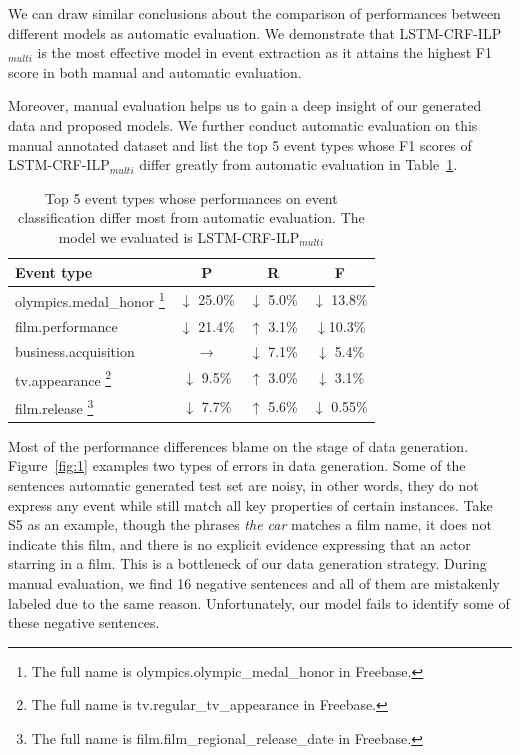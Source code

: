 \documentclass{article}
\begin{document}
We can draw similar conclusions about the comparison of performances between different models as automatic evaluation. We demonstrate that LSTM-CRF-ILP$_{multi}$ is the most effective model in event extraction as it attains the highest F1 score in both manual and automatic evaluation.

Moreover, manual evaluation helps us to gain a deep insight of our generated data and proposed models. We further conduct automatic evaluation on this manual annotated dataset and list the top 5 event types whose F1 scores of LSTM-CRF-ILP$_{multi}$ differ greatly from automatic evaluation in Table~\ref{tab:4}. 

\begin{table}[h]
\centering
\begin{tabular}{|l|c|c|c|} \hline
	Event type & P & R & F \\ \hline
	olympics.medal\_honor \footnote{The full name is olympics.olympic\_medal\_honor in Freebase.} & $\downarrow$ 25.0\% & $\downarrow$ 5.0\% & $\downarrow$ 13.8\% \\ \hline
	film.performance & $\downarrow$ 21.4\% & $\uparrow$ 3.1\% & $\downarrow$10.3\% \\ \hline
	business.acquisition & $\rightarrow$ & $\downarrow$ 7.1\% & $\downarrow$ 5.4\% \\ \hline
	tv.appearance \footnote{The full name is tv.regular\_tv\_appearance in Freebase.} & $\downarrow$ 9.5\% & $\uparrow$ 3.0\% & $\downarrow$ 3.1\% \\ \hline
	film.release \footnote{The full name is film.film\_regional\_release\_date in Freebase.} & $\downarrow$ 7.7\% & $\uparrow$ 5.6\% & $\downarrow$ 0.55\% \\ \hline
\end{tabular}
\caption{Top 5 event types whose performances on event classification differ most from automatic evaluation. The model we evaluated is LSTM-CRF-ILP$_{multi}$ \label{tab:4}}
\end{table}

Most of the performance differences blame on the stage of data generation. Figure~\ref{fig:1} examples two types of errors in data generation. Some of the sentences automatic generated test set are noisy, in other words, they do not express any event while still match all key properties of certain instances. Take S5 as an example, though the phrases \emph{the car} matches a film name, it does not indicate this film, and there is no explicit evidence expressing that an actor starring in a film. This is a bottleneck of our data generation strategy. During manual evaluation, we find 16 negative sentences and all of them are mistakenly labeled due to the same reason. Unfortunately, our model fails to identify some of these negative sentences.
\end{document}

